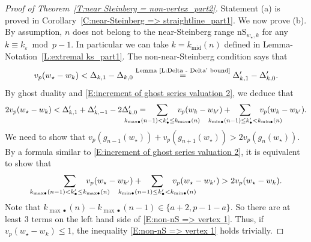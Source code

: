 \documentclass[12pt]{amsart}
\theoremstyle{definition}
\numberwithin{equation}{subsection}
\newcommand{\nS}{\mathrm{nS}}
\newcommand{\midd}{\mathrm{mid}}
\begin{document}
\begin{proof}[Proof of Theorem~\ref{T:near Steinberg = non-vertex_part2}]
Statement (a) is proved in Corollary~\ref{C:near-Steinberg => straightline_part1}.
We now prove (b). By assumption, $n$ does not belong to the near-Steinberg range $\nS_{w_\star,k}$ for any $k\equiv k_\varepsilon \bmod p-1$. In particular we can take $k=k_{\midd}(n)$ defined in Lemma-Notation~\ref{L:extremal ks_part1}. The non-near-Steinberg condition says that
$$v_p(w_\star - w_k) < \Delta_{k, 1} - \Delta_{k, 0} \stackrel{\textrm{Lemma~\ref{L:Delta - Delta' bound}}}= \Delta'_{k,1}-\Delta'_{k,0}.
$$
By ghost duality and \eqref{E:increment of ghost series valuation 2}, we deduce that
\begin{equation}
\label{E:vp(wbullet - wk)< Delta -Delta explained}
2v_p(w_\star - w_k) < \Delta'_{k, 1} + \Delta'_{k, -1} - 2\Delta'_{k, 0} =\hspace{-30pt}\sum_{
k_{{\max}\bullet}(n-1) < k'_\bullet \leq k_{{\max}\bullet}(n)} 
\hspace{-30pt} v_p(w_k - w_{k'})
+\hspace{-30pt}
\sum_{
k_{{\min}\bullet}(n-1) \leq k'_\bullet < k_{{\min}\bullet}(n)}
\hspace{-30pt}v_p(w_k - w_{k'}).
\end{equation}
We need to show that
$v_p(g_{n-1}(w_\star)) + v_p(g_{n+1}(w_\star)) > 2v_p(g_n(w_\star))$. By a formula similar to \eqref{E:increment of ghost series valuation 2}, it is equivalent to show that
\begin{equation}
\label{E:non-nS => vertex 1}
\sum_{
k_{{\max}\bullet}(n-1) < k'_\bullet \leq k_{{\max}\bullet}(n)} 
\hspace{-30pt} v_p(w_\star - w_{k'})
+\hspace{-30pt}
\sum_{
k_{{\min}\bullet}(n-1) \leq k'_\bullet < k_{{\min}\bullet}(n)}
\hspace{-30pt}v_p(w_\star - w_{k'})
> 
2 v_p(w_\star - w_{k}).
\end{equation}
Note that $k_{{\max}\bullet}(n) - k_{{\max}\bullet}(n-1)\in \{a+2,p-1-a\}$. So there are at least $3$ terms on the left hand side of \eqref{E:non-nS => vertex 1}. Thus, if $v_p(w_\star - w_k)\leq 1$, the inequality \eqref{E:non-nS => vertex 1} holds trivially.


\end{proof}
\end{document}
